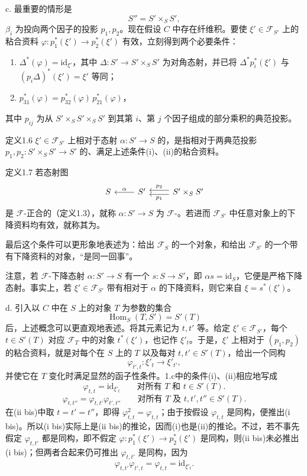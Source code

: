 c. 最重要的情形是
\[
S''=S'\times_SS',
\]
$\beta_i$ 为投向两个因子的投影 $p_1,p_2$。现在假设 $C$ 中存在纤维积。要使 $\xi'\in\mathcal F_{S'}$ 上的粘合资料 $\varphi:p_1^*(\xi')\to p_2^*(\xi')$ 有效，立刻得到两个必要条件：
\begin{enumerate}[label=(\roman*)]
\item $\Delta^*(\varphi)=\mathrm{id}_{\xi'}$，其中 $\Delta:S'\to S'\times_SS'$ 为对角态射，并已将 $\Delta^*p_i^*(\xi')$ 与 $(p_i\Delta)^*(\xi')=\xi'$ 等同；
\item $p_{31}^*(\varphi)=p_{32}^*(\varphi)\,p_{21}^*(\varphi)$，
\end{enumerate}
其中 $p_{ij}$ 为从 $S'\times_SS'\times_SS'$ 到其第 $i$、第 $j$ 个因子组成的部分乘积的典范投影。
\begin{statement}{定义1.6}
$\xi'\in\mathcal F_{S'}$ 上相对于态射 $\alpha:S'\to S$ 的，是指相对于两典范投影 $p_1,p_2:S'\times_SS'\to S'$ 的、满足上述条件(i)、(ii)的粘合资料。
\end{statement}
\begin{statement}{定义1.7}
若态射图
\[
\begin{tikzcd}
S&S'\arrow[l,"\alpha"']&S'\times_SS'\arrow[l,shift left=.6ex,"p_1"]\arrow[l,shift right=.6ex,"p_2"']
\end{tikzcd}
\]
是 $\mathcal F$-正合的（定义1.3），就称 $\alpha:S'\to S$ 为 $\mathcal F$-。若进而 $\mathcal F_{S'}$ 中任意对象上的下降资料均有效，就称其为。
\end{statement}
最后这个条件可以更形象地表述为：给出 $\mathcal F_S$ 的一个对象，和给出 $\mathcal F_{S'}$ 的一个带有下降资料的对象，“是同一回事”。

注意，若 $\mathcal F$-下降态射 $\alpha:S'\to S$ 有一个 $s:S\to S'$，即 $\alpha s=\mathrm{id}_S$，它便是严格下降态射。事实上，若 $\xi'\in\mathcal F_{S'}$ 带有相对于 $\alpha$ 的下降资料，则它来自 $\xi=s^*(\xi')$。

 d. 引入以 $C$ 中在 $S$ 上的对象 $T$ 为参数的集合
\[
\operatorname{Hom}_S(T,S')=S'(T)
\]
后，上述概念可以更直观地表述。将其元素记为 $t,t'$ 等。给定 $\xi'\in\mathcal F_{S'}$，每个 $t\in S'(T)$ 对应 $\mathcal F_T$ 中的对象 $t^*(\xi')$，也记作 $\xi'_t$。于是，$\xi'$ 上相对于 $(p_1,p_2)$ 的粘合资料，就是对每个在 $S$ 上的 $T$ 以及每对 $t,t'\in S'(T)$，给出一个同构
\[
\varphi_{t',t}:\xi'_t\longrightarrow\xi'_{t'},
\]
并使它在 $T$ 变化时满足显然的函子性条件。1.c中的条件(i)、(ii)相应地写成
\[
\varphi_{t,t}=\mathrm{id}_{\xi'_t}\qquad\text{对所有 $T$ 和 $t\in S'(T)$}.
\tag{i bis}
\]
\[
\varphi_{t,t''}=\varphi_{t,t'}\varphi_{t',t''}
\qquad\text{对所有 $T$ 及 $t,t',t''\in S'(T)$}.
\tag{ii bis}
\]
在(ii bis)中取 $t=t'=t''$，即得 $\varphi_{t,t}^2=\varphi_{t,t}$；由于按假设 $\varphi_{t,t}$ 是同构，便推出(i bis)。所以(i bis)实际上是(ii bis)的推论，因而(i)也是(ii)的推论。不过，若不事先假定 $\varphi_{t,t'}$ 都是同构，即不假定 $\varphi:p_1^*(\xi')\to p_2^*(\xi')$ 是同构，则(ii bis)未必推出(i bis)；但两者合起来仍可推出 $\varphi_{t,t'}$ 是同构，因为
\[
\varphi_{t,t'}\varphi_{t',t}=\varphi_{t,t}=\mathrm{id}_{\xi'_t}.
\]

